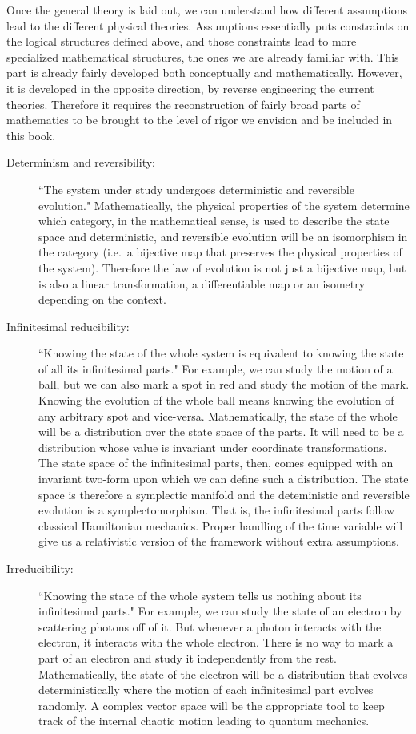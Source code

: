 \documentclass[11pt,letterpaper,fleqn]{memoir} %
\begin{document}
Once the general theory is laid out, we can understand how different assumptions lead to the different physical theories. Assumptions essentially puts constraints on the logical structures defined above, and those constraints lead to more specialized mathematical structures, the ones we are already familiar with. This part is already fairly developed both conceptually and mathematically. However, it is developed in the opposite direction, by reverse engineering the current theories. Therefore it requires the reconstruction of fairly broad parts of mathematics to be brought to the level of rigor we envision and be included in this book.

\begin{description}
	\item[Determinism and reversibility:] ``The system under study undergoes deterministic and reversible evolution." Mathematically, the physical properties of the system determine which category, in the mathematical sense, is used to describe the state space and deterministic, and reversible evolution will be an isomorphism in the category (i.e.~a bijective map that preserves the physical properties of the system). Therefore the law of evolution is not just a bijective map, but is also a linear transformation, a differentiable map or an isometry depending on the context.
	
	\item[Infinitesimal reducibility:] ``Knowing the state of the whole system is equivalent to knowing the state of all its infinitesimal parts." For example, we can study the motion of a ball, but we can also mark a spot in red and study the motion of the mark. Knowing the evolution of the whole ball means knowing the evolution of any arbitrary spot and vice-versa. Mathematically, the state of the whole will be a distribution over the state space of the parts. It will need to be a distribution whose value is invariant under coordinate transformations. The state space of the infinitesimal parts, then, comes equipped with an invariant two-form upon which we can define such a distribution. The state space is therefore a symplectic manifold and the deteministic and reversible evolution is a symplectomorphism. That is, the infinitesimal parts follow classical Hamiltonian mechanics. Proper handling of the time variable will give us a relativistic version of the framework without extra assumptions.
	 
	\item[Irreducibility:] ``Knowing the state of the whole system tells us nothing about its infinitesimal parts." For example, we can study the state of an electron by scattering photons off of it. But whenever a photon interacts with the electron, it interacts with the whole electron. There is no way to mark a part of an electron and study it independently from the rest. Mathematically, the state of the electron will be a distribution that evolves deterministically where the motion of each infinitesimal part evolves randomly. A complex vector space will be the appropriate tool to keep track of the internal chaotic motion leading to quantum mechanics.
	

\end{description}
\end{document}
